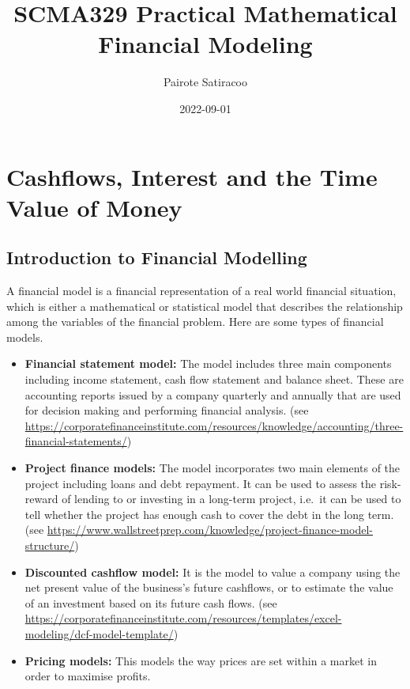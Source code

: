 \documentclass[
]{book}
\title{SCMA329 Practical Mathematical Financial Modeling}
\author{Pairote Satiracoo}
\date{2022-09-01}
\theoremstyle{definition}
\theoremstyle{definition}
\theoremstyle{definition}
\theoremstyle{definition}
\theoremstyle{remark}
\begin{document}
\maketitle

{
\setcounter{tocdepth}{1}
\tableofcontents
}
\hypertarget{cashflows-interest-and-the-time-value-of-money}{%
\chapter{Cashflows, Interest and the Time Value of Money}\label{cashflows-interest-and-the-time-value-of-money}}

\hypertarget{introduction-to-financial-modelling}{%
\section{Introduction to Financial Modelling}\label{introduction-to-financial-modelling}}

A financial model is a financial representation of a real world
financial situation, which is either a mathematical or statistical model
that describes the relationship among the variables of the financial
problem. Here are some types of financial models.

\begin{itemize}
\item
  \textbf{Financial statement model:} The model includes three main
  components including income statement, cash flow statement and
  balance sheet. These are accounting reports issued by a company
  quarterly and annually that are used for decision making and
  performing financial analysis. (see
  \url{https://corporatefinanceinstitute.com/resources/knowledge/accounting/three-financial-statements/})
\item
  \textbf{Project finance models:} The model incorporates two main elements
  of the project including loans and debt repayment. It can be used to
  assess the risk-reward of lending to or investing in a long-term
  project, i.e.~it can be used to tell whether the project has enough
  cash to cover the debt in the long term. (see
  \url{https://www.wallstreetprep.com/knowledge/project-finance-model-structure/})
\item
  \textbf{Discounted cashflow model:} It is the model to value a company
  using the net present value of the business's future cashflows, or
  to estimate the value of an investment based on its future cash
  flows. (see
  \url{https://corporatefinanceinstitute.com/resources/templates/excel-modeling/dcf-model-template/})
\item
  \textbf{Pricing models:} This models the way prices are set within a
  market in order to maximise profits.
\end{itemize}
\end{document}
